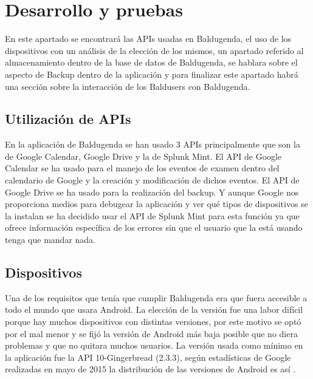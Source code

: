 \section{Desarrollo y pruebas}
\label{secc:desarrollo y pruebas}
En este apartado se encontrará las APIs usadas en Baldugenda, el uso de los dispositivos con un análisis de la elección de los mismos, un apartado referido al almacenamiento dentro de la base de datos de Baldugenda, se hablara sobre el aspecto de Backup dentro de la aplicación y para finalizar este apartado habrá una sección sobre la interacción de los Baldusers con Baldugenda.
\subsection{Utilización de APIs}
\label{subsecc:Utilización de APIs}

En la aplicación de Baldugenda se han usado 3 APIs principalmente que son la de Google Calendar, Google Drive y la de Splunk Mint.
El API de Google Calendar se ha usado para el manejo de los eventos de examen dentro del calendario de Google y la creación y modificación de dichos eventos.
El API de Google Drive se ha usado para la realización del backup.
Y aunque Google nos proporciona medios para debugear la aplicación y ver qué tipos de dispositivos se la instalan se ha decidido usar el API de Splunk Mint para esta función ya que ofrece información específica de los errores sin que el usuario que la está usando tenga que mandar nada.

\subsection{Dispositivos}
\label{subsecc:Dispositivos}

Una de los requisitos que tenía que cumplir Baldugenda era que fuera accesible a todo el mundo que usara Android. La elección de la versión fue una labor difícil porque hay muchos dispositivos con distintas versiones, por este motivo se optó por el mal menor y se fijó la versión de Android más baja posible que no diera problemas y que no quitara muchos usuarios.
La versión usada como mínimo en la aplicación fue la API 10-Gingerbread (2.3.3), según estadísticas de Google realizadas en mayo de 2015 la distribución de las versiones de Android es así \cite{dashboards}.

